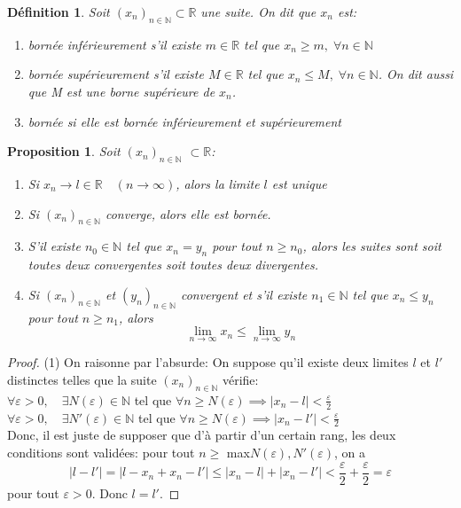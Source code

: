 \documentclass[a4paper, 12pt, french, twoside]{article}
\newtheorem{proposition}[theorem]{Proposition}
\newtheorem{defi}[theorem]{Définition}
\newcommand{\Nn}{{\mathbb{N}}}
\newcommand{\Rr}{{\mathbb{R}}}
\begin{document}
\begin{defi}
    Soit $(x_n)_{n\in\Nn}\subset \Rr$ une suite. On dit que $x_n$ est:
    \begin{enumerate}
        \item bornée inférieurement s'il existe $m\in \Rr$ tel que $x_n\geq m,\; \forall n\in\Nn$
        \item bornée supérieurement s'il existe $M\in\Rr$ tel que $x_n\leq M,\; \forall n \in\Nn$. On dit aussi que M est une borne supérieure de $x_n$.
        \item bornée si elle est bornée inférieurement et supérieurement
    \end{enumerate}
\end{defi}
\begin{proposition}Soit $(x_n)_{n\in\Nn}$ $\subset \Rr$:
\begin{enumerate}
  \item Si $x_n\longrightarrow l\in \Rr \quad(n\rightarrow\infty)$, alors la limite $l$ est unique
  \item Si $(x_n)_{n\in\Nn}$ converge, alors elle est bornée.
  \item S'il existe $n_0\in\Nn$ tel que $x_n=y_n$ pour tout $n\geq n_0$, alors les suites sont soit toutes deux convergentes soit toutes deux divergentes.
  \item Si $(x_n)_{n\in\Nn}$ et $(y_n)_{n\in\Nn}$ convergent et s'il existe $n_1\in \Nn$ tel que $x_n\leq y_n$ pour tout $n\geq n_1$, alors \[\lim_{n\rightarrow\infty}x_n\leq\lim_{n\rightarrow\infty}y_n\]
\end{enumerate}
\end{proposition}
\begin{proof}
(1) On raisonne par l'absurde:
On suppose qu'il existe deux limites $l$ et $l'$ distinctes telles que la suite $(x_n)_{n\in\Nn}$ vérifie: 
\\$\forall \varepsilon>0 ,\quad \exists N(\varepsilon)\in\Nn$ tel que $ \forall n \geq N(\varepsilon) \implies |x_n-l|<\frac{\varepsilon}{2}$
\\$\forall \varepsilon>0 ,\quad \exists N'(\varepsilon)\in\Nn$ tel que $ \forall n \geq N(\varepsilon) \implies |x_n-l'|<\frac{\varepsilon}{2}$
\\Donc, il est juste de supposer que d'à partir d'un certain rang, les deux conditions sont validées: pour tout $n\geq$ max{$N(\varepsilon), N'(\varepsilon)$}, on a
\begin{equation*}
    |l-l'|=|l-x_n+x_n-l'|\leq |x_n-l|+|x_n-l'|<\frac{\varepsilon}{2}+\frac{\varepsilon}{2}=\varepsilon
\end{equation*}
pour tout $\varepsilon>0$.
Donc $l=l'$.
\end{proof}
\end{document}
